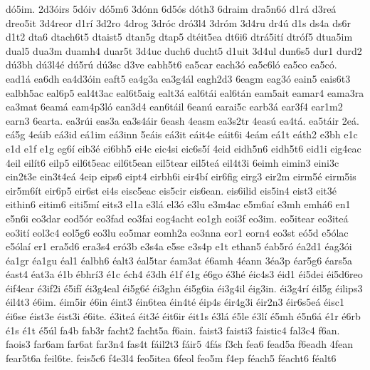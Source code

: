 {d^^f35im.
2d3^^f3irs
5d^^f3iv
d^^f35m6
3d^^f3nn
6d5^^f3s
d^^f3th3
6draim
dra5n6^^f3
d1r^^e1
d3re^^e1
dreo5it
3d4reor
d1r^^ed
3d2ro
4drog
3dr^^f3c
dr^^f33l4
3dr^^f3m
3d4ru
dr4^^fa
d1s
ds4a
ds6r
d1t2
dta6
dtach6t5
dtaist5
dtan5g
dtap5
dt^^e9it5ea
dt6i6
dtr^^e15it^^ed
dtr^^f3f5
dtua5im
dual5
dua3m
duamh4
duar5t
3d4uc
duch6
ducht5
d1uit
3d4ul
dun6s5
dur1
durd2
d^^fa3bh
d^^fa3l4^^e9
d^^fa5r^^fa
d^^fa3sc
d3ve
eabh5t6
ea5car
each3^^f3
ea5c6l^^f3
ea5co
ea5c^^f3.
ead1^^e1
ea6dh
ea4d3^^f3in
eaft5
ea4g3a
ea3g4^^e1l
eagh2d3
6eagm
eag3^^f3
eain5
eais6t3
ealbh5ac
eal6p5
eal4t3ac
eal6t5aig
ealt3^^e1
eal6t^^e1i
eal6t^^e1n
eam5ait
eamar4
eama3ra
ea3mat
6eam^^e1
eam4p3l^^f3
ean3d4
ean6t^^e1il
6ean^^fa
earai5c
earb3^^e1
ear3f4
ear1m2
earn3
6earta.
ea3r^^fai
eas3a
ea3s4^^e1ir
6eash
4easm
ea3s2tr
4eas^^fa
ea4t^^e1.
ea5t^^e1ir
2e^^e1.
e^^e15g
4e^^e1ib
e^^e13id
e^^e11im
e^^e13inn
5e^^e1is
e^^e13it
e^^e1it4e
e^^e1it6i
4e^^e1m
e^^e11t
e^^e1th2
e3bh
e1c
e1d
e1f
e1g
eg6^^ed
eib3^^e9
ei6bh5
ei4c
eic4si
eic6s5^^ed
4eid
eidh5n6
eidh5t6
eid1i
eig4eac
4eil
eil^^edt6
eilp5
eil6t5eac
eil6t5ean
eil5tear
eil5te^^e1
eil4t3i
6eimh
eimin3
eini3c
ein2t3e
ein3t4e^^e1
4eip
eips6
eipt4
eirbh6i
eir4b^^ed
eir6fig
eirg3
eir2m
eirm5^^e9
eirm5is
eir5m6^^edt
eir6p5
eir6st
ei4s
eisc5eac
eis5cir
eis6ean.
eis6ilid
eis5in4
eist3
eit3^^e9
eithin6
eitim6
eiti5m^^ed
eits3
el1a
e3l^^e1
el3^^f3
e3lu
e3m4ac
e5m6a^^ed
e3mh
emh^^e16
en1
e5n6i
eo3dar
eod5^^f3r
eo3fad
eo3fai
eog4acht
eo1gh
eoi3f
eo3im.
eo5itear
eo3ite^^e1
eo3it^^ed
eol3c4
eol5g6
eo3lu
eo5mar
eomh2a
eo3nna
eor1
eorn4
eo3st
e^^f35d
e5^^f3lac
e5^^f3la^^ed
er1
era5d6
era3s4
er^^f33b
e3s4a
e5se
e3s4p
e1t
ethan5
^^e9ab5r^^f3
^^e9a2d1
^^e9ag3^^f3i
^^e9a1gr
^^e9a1gu
^^e9al1
^^e9albh6
^^e9alt3
^^e9al5tar
^^e9am3at
^^e96amh
4^^e9ann
3^^e9a3p
^^e9ar5g6
^^e9ars5a
^^e9ast4
^^e9at3a
^^e91b
^^e9bhr^^ed3
^^e91c
^^e9ch4
^^e93dh
^^e91f
^^e91g
^^e96go
^^e93h^^e9
^^e9ic4s3
^^e9id1
^^e9i5dei
^^e9i5d6reo
^^e9if4ear
^^e93if2i
^^e95if^^ed
^^e9i3g4eal
^^e9i5g6^^e9
^^e9i3ghn
^^e9i5g6ia
^^e9i3g4il
^^e9ig3in.
^^e9i3g4r^^ed
^^e9il5g
^^e9ilips3
^^e9il4t3
^^e96im.
^^e9im5ir
^^e96in
^^e9int3
^^e9in6tea
^^e9in4t^^e9
^^e9ip4s
^^e9ir4g3i
^^e9ir2n3
^^e9ir6s5e^^e1
^^e9isc1
^^e9i6se
^^e9ist3e
^^e9ist3i
^^e96ite.
^^e93ite^^e1
^^e9it3^^e9
^^e9it6ir
^^e9it1s
^^e93l^^e1
^^e95le
^^e93l^^ed
^^e95mh
^^e95n6^^e1
^^e91r
^^e96rb
^^e91s
^^e91t
^^e95^^fal
fa4b
fab3r
facht2
facht5a
f6ain.
faist3
faisti3
faistic4
fal3c4
f6an.
faois3
far6am
far6at
far3n4
fas4t
f^^e1il2t3
f^^e1ir5
4f^^e1s
f3ch
fea6
fead5a
f6eadh
4fean
fear5t6a
feil6te.
feis5c6
f4e3l4
feo5itea
6feol
feo5m
f4ep
f^^e9ach5
f^^e9acht6
f^^e9alt6
}

